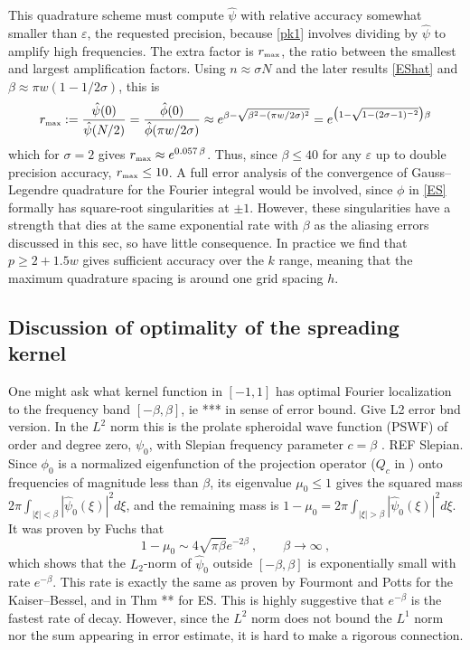 \documentclass[10pt]{article}
\newcommand{\be}{\begin{equation}}
\newcommand{\ee}{\end{equation}}
\newcommand{\tbox}[1]{{\mbox{\tiny #1}}}
\newcommand{\eps}{\varepsilon}
\newcommand{\freq}{\beta}          %
\newcommand{\rat}{\sigma}          %
\newcommand{\rmax}{r_\tbox{max}}    %
\newcommand{\KB}{Kaiser--Bessel}
\begin{document}
This quadrature scheme must compute $\hat\psi$
with relative accuracy
somewhat smaller than $\eps$, the requested precision,
because \eqref{pk1} involves dividing by $\hat\psi$ to amplify
high frequencies.
The extra factor is $\rmax$, the ratio between the smallest and largest
amplification factors. Using $n\approx \rat N$ and
the later results \eqref{EShat} and $\beta \approx \pi w( 1- 1/2\rat)$,
this is
\be
\rmax := \frac{\hat\psi(0)}{\hat\psi(N/2)}
= \frac{\hat\phi(0)}{\hat\phi(\pi w/2\rat)}
\approx e^{\freq - \sqrt{\freq^2 - (\pi w/2\rat)^2}}
= e^{\bigl(1 - \sqrt{1-(2\rat-1)^{-2}}\bigr)\freq}
\label{rmax}
\ee
which for $\rat=2$ gives $\rmax \approx e^{0.057\,\freq}$.
Thus, since $\beta\le40$ for any $\eps$
up to double precision accuracy, $\rmax\le 10$.
A full error analysis of the convergence of Gauss--Legendre quadrature
for the Fourier integral would be involved, since $\phi$ in \eqref{ES}
formally has square-root singularities at $\pm 1$.
However, these singularities have a strength that dies at the same
exponential rate with $\freq$
as the aliasing errors discussed in this sec, so have
little consequence.
In practice we find that $p\ge 2+1.5 w$ gives sufficient accuracy
over the $k$ range,
meaning that the maximum quadrature spacing is around one
grid spacing $h$.






\subsection{Discussion of optimality of the spreading kernel}
\label{s:optim}

One might ask what kernel function in $[-1,1]$ has optimal Fourier localization
to the frequency band $[-\freq,\freq]$,
ie *** in sense of error bound.
Give L2 error bnd version.
In the $L^2$ norm this is the prolate spheroidal wave function (PSWF)
of order and degree zero, $\psi_0$,
with Slepian frequency parameter $c=\freq$
\cite{osipov}. REF Slepian.
Since $\phi_0$ is a normalized eigenfunction of the projection operator
($Q_c$ in \cite{osipov}) onto frequencies
of magnitude less than $\freq$,
its eigenvalue $\mu_0\le 1$ gives the
squared mass
$2\pi \int_{|\xi|<\freq}|\hat\psi_0(\xi)|^2 d\xi$,
and the remaining mass is
$1-\mu_0 =2\pi \int_{|\xi|>\freq}|\hat\psi_0(\xi)|^2 d\xi$.
It was proven by Fuchs \cite{fuchs} that
\be
1 - \mu_0 \sim 4\sqrt{\pi\freq} e^{-2\freq} ~, \qquad \freq\to\infty~,
\label{fuchs}
\ee
which shows that the $L_2$-norm of $\hat\psi_0$ outside
$[-\freq,\freq]$ is exponentially small with rate $e^{-\freq}$.
This rate is exactly the same as
proven by Fourmont and Potts for the \KB, and in Thm ** for ES.
This is highly suggestive that $e^{-\freq}$ is the fastest
rate of decay.
However, since the $L^2$ norm does not bound the $L^1$ norm
nor the sum appearing in error estimate,
it is hard to make a rigorous connection.
\end{document}
